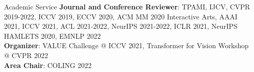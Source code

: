 \documentclass{resume} %
\begin{document}
\begin{rSection}{Academic Service}
    \textbf{Journal and Conference Reviewer}: TPAMI, IJCV, CVPR 2019-2022, ICCV 2019, ECCV 2020, ACM MM 2020 Interactive Arts, AAAI 2021, ICCV 2021, ACL 2021-2022, NeurIPS 2021-2022, ICLR 2021, NeurIPS HAMLETS 2020, EMNLP 2022 \\
    \textbf{Organizer}:  VALUE Challenge @ ICCV 2021, Transformer for Vision Workshop @ CVPR 2022 \\
    \textbf{Area Chair}: COLING 2022
    
\end{rSection}



    
\end{document}
